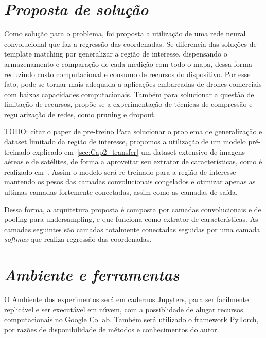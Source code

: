 \section{\textit{Proposta de solução}}\label{sec:Cap3_Proposta}

Como solução para o problema, foi proposta a utilização de uma rede neural convolucional que faz a regressão das coordenadas. Se diferencia das soluções de template matching por generalizar a região de interesse, dispensando o armazenamento e comparação de cada medição com todo o mapa, dessa forma reduzindo custo computacional e consumo de recursos do dispositivo. Por esse fato, pode se tornar mais adequada a aplicações embarcadas de drones comerciais com baixas capacidades computacionais. Também para solucionar a questão de limitação de recursos, propõe-se a experimentação de técnicas de compressão e regularização de redes, como pruning e dropout.

TODO: citar o paper de pre-treino
Para solucionar o problema de generalização e dataset limitado da região de interesse, propomos a utilização de um modelo pré-treinado explicado em~\ref{sec:Cap2_transfer} um dataset extensivo de imagens aéreas e de satélites, de forma a aproveitar seu extrator de características, como é realizado em~\cite{Shiguemori2016Embedded}. Assim o modelo será re-treinado para a região de interesse mantendo os pesos das camadas convolucionais congelados e otimizar apenas as ultimas camadas fortemente conectadas, assim como as camadas de saída. 

Dessa forma, a arquitetura proposta é composta por camadas convolucionais e de pooling para undersampling, e que funciona como extrator de características. As camadas seguintes são camadas totalmente conectadas seguidas por uma camada \textit{softmax} que realiza regressão das coordenadas.

\section{\textit{Ambiente e ferramentas}}\label{sec:Cap3_Ferramentas}


O Ambiente dos experimentos será em cadernos Jupyters, para ser facilmente replicável e ser executável em núvem, com a possiblidade de alugar recursos computacionais no Google Collab. Também será utilizado o framework PyTorch, por razões de disponibilidade de métodos e conhecimentos do autor.

